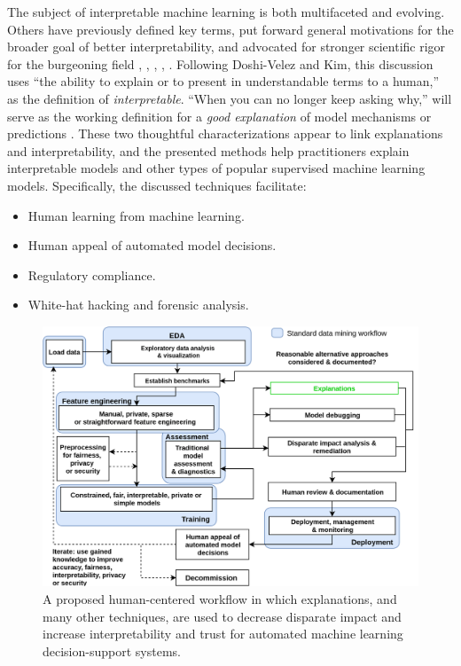 \documentclass[sigconf]{acmart}
\begin{document}
The subject of interpretable machine learning is both multifaceted and evolving. Others have previously defined key terms, put forward general motivations for the broader goal of better interpretability, and advocated for stronger scientific rigor for the burgeoning field \cite{been_kim1}, \cite{gilpin2018explaining}, \cite{guidotti2018survey}, \cite{lipton1}, \cite{weller2017challenges}. Following Doshi-Velez and Kim, this discussion uses ``the ability to explain or to present in understandable terms to a human,'' as the definition of \textit{interpretable}. ``When you can no longer keep asking why,'' will serve as the working definition for a \textit{good explanation} of model mechanisms or predictions \cite{gilpin2018explaining}. These two thoughtful characterizations appear to link explanations and interpretability, and the presented methods help practitioners explain interpretable models and other types of popular supervised machine learning models. Specifically, the discussed techniques facilitate:

\begin{itemize}
	\item Human learning from machine learning.
	\item Human appeal of automated model decisions. 
	\item Regulatory compliance.
	\item White-hat hacking and forensic analysis.
\end{itemize}

\begin{figure}[hb]
	\begin{center}
		\includegraphics[scale=0.1]{img/figure_1_lo.png}
		\caption{A proposed human-centered workflow in which explanations, and many other techniques, are used to decrease disparate impact and increase interpretability and trust for automated machine learning decision-support systems.}
		\label{fig:hc_ml}
	\end{center}
\end{figure}
\end{document}
